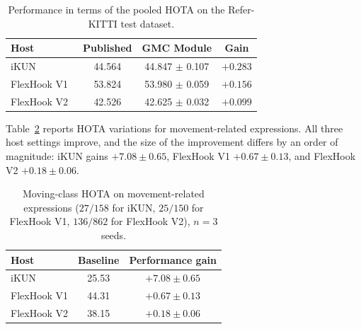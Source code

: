 \documentclass{article}
\begin{document}
\begin{table}
  \centering
  \caption{Performance in terms of the pooled HOTA on the Refer-KITTI test dataset.}
  \label{tab:main}
  \small
  \setlength{\tabcolsep}{2pt}
  \begin{tabular}{lccc}
    \hline
    Host                        & Published & GMC Module           & Gain                      \\
    \hline
    iKUN~\cite{ikun}            & 44.564    & 44.847 $\pm$ 0.107 & $+0.283$ \\
    FlexHook V1~\cite{flexhook} & 53.824    & 53.980 $\pm$ 0.059 & $+0.156$ \\
    FlexHook V2~\cite{flexhook} & 42.526    & 42.625 $\pm$ 0.032 & $+0.099$ \\
    \hline
  \end{tabular}
\end{table}


Table~\ref{tab:deficit} reports HOTA variations for movement-related expressions. All three host settings improve, and the size of the improvement differs by an order of magnitude: iKUN gains $+7.08\pm0.65$, FlexHook V1 $+0.67\pm0.13$, and FlexHook V2 $+0.18\pm0.06$.



\begin{table}
  \centering
  \caption{Moving-class HOTA on movement-related expressions ($27/158$ for iKUN, $25/150$ for FlexHook V1, $136/862$ for FlexHook V2), $n{=}3$ seeds.}
  \label{tab:deficit}
  \small
  \setlength{\tabcolsep}{2pt}
  \begin{tabular}{lcc}
    \hline
    Host        & Baseline & Performance gain \\
    \hline
    iKUN        & 25.53    & $+7.08\pm0.65$   \\
    FlexHook V1 & 44.31    & $+0.67\pm0.13$   \\
    FlexHook V2 & 38.15    & $+0.18\pm0.06$   \\
    \hline
  \end{tabular}
\end{table}
\end{document}
